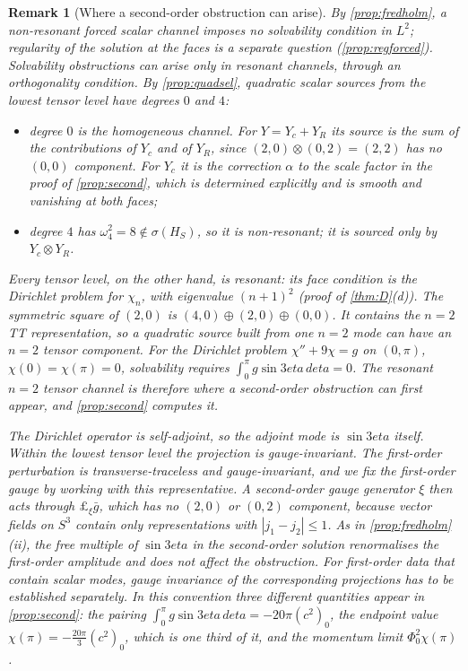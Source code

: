 \documentclass[11pt]{article}
\theoremstyle{canonmath}
\newtheorem{remark}[theorem]{Remark}
\theoremstyle{canonpostulate}
\theoremstyle{canonproposition}
\theoremstyle{canonmath}
\theoremstyle{canonproposition}
\def\mathcal#1{#1}%
\def\eta{eta}%
\begin{document}
\begin{remark}[Where a second-order obstruction can arise]\label{rem:resonant}
By \cref{prop:fredholm}, a non-resonant forced scalar channel imposes no solvability condition in $L^2$; regularity of the solution at the faces is a separate question (\cref{prop:regforced}). Solvability obstructions can arise only in resonant channels, through an orthogonality condition. By \cref{prop:quadsel}, quadratic scalar sources from the lowest tensor level have degrees $0$ and $4$:
\begin{itemize}
\item degree $0$ is the homogeneous channel. For $Y = Y_c+Y_R$ its source is the sum of the contributions of $Y_c$ and of $Y_R$, since $(2,0)\otimes(0,2) = (2,2)$ has no $(0,0)$ component. For $Y_c$ it is the correction $\alpha$ to the scale factor in the proof of \cref{prop:second}, which is determined explicitly and is smooth and vanishing at both faces;
\item degree $4$ has $\omega_4^2 = 8\notin\sigma(\mathcal{H}_S)$, so it is non-resonant; it is sourced only by $Y_c\otimes Y_R$.
\end{itemize}
Every tensor level, on the other hand, is resonant: its face condition is the Dirichlet problem for $\chi_n$, with eigenvalue $(n+1)^2$ (proof of \cref{thm:D}(d)). The symmetric square of $(2,0)$ is $(4,0)\oplus(2,0)\oplus(0,0)$. It contains the $n=2$ TT representation, so a quadratic source built from one $n=2$ mode can have an $n=2$ tensor component. For the Dirichlet problem $\chi''+9\chi = g$ on $(0,\pi)$, $\chi(0) = \chi(\pi) = 0$, solvability requires $\int_0^\pi g\sin3\eta\,d\eta = 0$. The resonant $n=2$ tensor channel is therefore where a second-order obstruction can first appear, and \cref{prop:second} computes it.

The Dirichlet operator is self-adjoint, so the adjoint mode is $\sin3\eta$ itself. Within the lowest tensor level the projection is gauge-invariant. The first-order perturbation is transverse-traceless and gauge-invariant, and we fix the first-order gauge by working with this representative. A second-order gauge generator $\xi$ then acts through $\pounds_\xi\bar g$, which has no $(2,0)$ or $(0,2)$ component, because vector fields on $S^3$ contain only representations with $|j_1-j_2|\le1$. As in \cref{prop:fredholm}(ii), the free multiple of $\sin3\eta$ in the second-order solution renormalises the first-order amplitude and does not affect the obstruction. For first-order data that contain scalar modes, gauge invariance of the corresponding projections has to be established separately. In this convention three different quantities appear in \cref{prop:second}: the pairing $\int_0^\pi g\sin3\eta\,d\eta = -20\pi(c^2)_0$, the endpoint value $\chi(\pi) = -\tfrac{20\pi}3(c^2)_0$, which is one third of it, and the momentum limit $\Phi_0^2\chi(\pi)$.
\end{remark}
\end{document}
